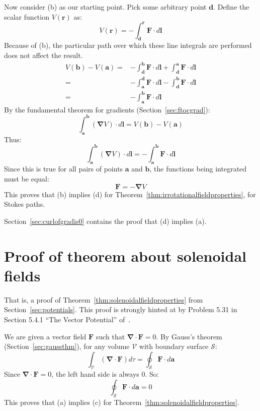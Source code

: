 \documentclass[a4paper]{article}
\theoremstyle{plain}
\theoremstyle{definition}
\newcommand{\vect}[1]{\textbf{#1}}
\newcommand{\del}{\bm{\nabla}}
\begin{document}
Now consider (b) as our starting point.  Pick some arbitrary point
$\vect{d}$.  Define the scalar function $V(\vect{r})$ as:
\begin{equation}
V(\vect{r}) = - \int_{\vect{d}}^{\vect{r}} \vect{F} \cdot d\vect{l}
\end{equation}
Because of (b), the particular path over which these line integrals
are performed does not affect the result.
\begin{align*}
V(\vect{b}) - V(\vect{a})
  = & - \int_{\vect{d}}^{\vect{b}} \vect{F} \cdot d\vect{l}
      + \int_{\vect{d}}^{\vect{a}} \vect{F} \cdot d\vect{l} \\
  = & - \int_{\vect{a}}^{\vect{d}} \vect{F} \cdot d\vect{l}
      - \int_{\vect{d}}^{\vect{b}} \vect{F} \cdot d\vect{l} \\
  = & - \int_{\vect{a}}^{\vect{b}} \vect{F} \cdot d\vect{l}
\end{align*}
By the fundamental theorem for gradients (Section~\ref{sec:ftocgrad}):
\begin{equation}
\int_{\vect{a}}^{\vect{b}} (\del V) \cdot d\vect{l} = V(\vect{b}) - V(\vect{a})
\end{equation}
Thus:
\begin{equation}
       \int_{\vect{a}}^{\vect{b}} (\del V) \cdot d\vect{l}
   = - \int_{\vect{a}}^{\vect{b}} \vect{F} \cdot d\vect{l}
\end{equation}
Since this is true for all pairs of points $\vect{a}$ and $\vect{b}$,
the functions being integrated must be equal:
\begin{equation}
\vect{F} = - \del V
\end{equation}
This proves that (b) implies (d) for
Theorem~\ref{thm:irrotationalfieldproperties}, for Stokes paths.

Section~\ref{sec:curlofgradis0} contains the proof that (d) implies
(a).


\section{Proof of theorem about solenoidal fields}
\label{sec:potentialsthm2}

That is, a proof of Theorem~\ref{thm:solenoidalfieldproperties} from
Section~\ref{sec:potentials}.
This proof is strongly hinted at by Problem 5.31 in Section 5.4.1
``The Vector Potential'' of~\cite{Griffiths1998}.

We are given a vector field $\vect{F}$ such that
$\del \cdot \vect{F} = 0$.
By Gauss's theorem (Section~\ref{sec:gaussthm}),
for any volume $\mathcal{V}$ with boundary surface $\mathcal{S}$:
\begin{equation}
\int_{\mathcal{V}} (\del \cdot \vect{F}) d\tau = \oint_{\mathcal{S}} \vect{F} \cdot d\vect{a}
\end{equation}
Since $\del \cdot \vect{F} = 0$, the left hand side is always 0.
So:
\begin{equation}
\oint_{\mathcal{S}} \vect{F} \cdot d\vect{a} = 0
\end{equation}
This proves that (a) implies (c) for
Theorem~\ref{thm:solenoidalfieldproperties}.
\end{document}
